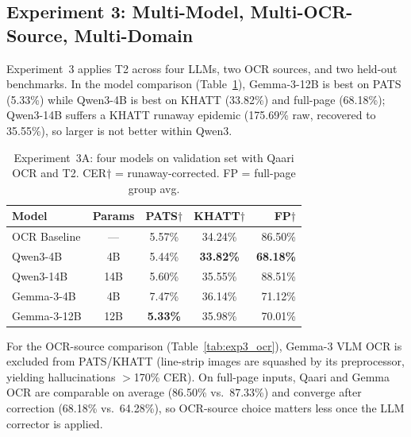 \documentclass[conference]{IEEEtran}
\begin{document}
\subsection{Experiment 3: Multi-Model, Multi-OCR-Source, Multi-Domain}

Experiment~3 applies T2 across four LLMs, two OCR sources, and two held-out
benchmarks. In the model comparison (Table~\ref{tab:exp3_models}), Gemma-3-12B
is best on PATS (5.33\%) while Qwen3-4B is best on KHATT (33.82\%) and full-page
(68.18\%); Qwen3-14B suffers a KHATT runaway epidemic (175.69\% raw, recovered
to 35.55\%), so larger is not better within Qwen3.

\begin{table}[t]
\caption{Experiment~3A: four models on validation set with Qaari OCR
and T2. CER$\dagger$ = runaway-corrected. FP = full-page group avg.}
\label{tab:exp3_models}
\begin{center}
\small
\begin{tabular}{lcccr}
\toprule
\textbf{Model} & \textbf{Params} & \textbf{PATS$\dagger$} & \textbf{KHATT$\dagger$} & \textbf{FP$\dagger$} \\
\midrule
OCR Baseline & --- & 5.57\% & 34.24\% & 86.50\% \\
Qwen3-4B     & 4B  & 5.44\% & \textbf{33.82\%} & \textbf{68.18\%} \\
Qwen3-14B    & 14B & 5.60\% & 35.55\% & 88.51\% \\
Gemma-3-4B   & 4B  & 7.47\% & 36.14\% & 71.12\% \\
Gemma-3-12B  & 12B & \textbf{5.33\%} & 35.98\% & 70.01\% \\
\bottomrule
\end{tabular}
\end{center}
\end{table}

For the OCR-source comparison (Table~\ref{tab:exp3_ocr}), Gemma-3 VLM OCR is
excluded from PATS/KHATT (line-strip images are squashed by its preprocessor,
yielding hallucinations $>$170\% CER). On full-page inputs, Qaari and Gemma OCR
are comparable on average (86.50\% vs.\ 87.33\%) and converge after correction
(68.18\% vs.\ 64.28\%), so OCR-source choice matters less once the LLM corrector
is applied.
\end{document}
